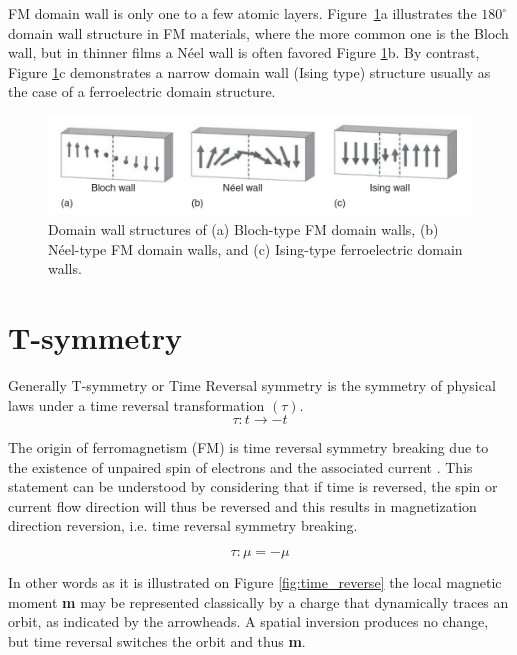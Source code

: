 FM domain wall is only one to a few atomic layers. Figure~\ref{fig:wall_structure}a illustrates the $180  ^\circ$ domain wall structure in FM materials, where the more common one is the Bloch wall, but in thinner films a Néel wall is often favored Figure \ref{fig:wall_structure}b. By contrast, Figure \ref{fig:wall_structure}c demonstrates a narrow domain wall (Ising type) structure usually as the case of a ferroelectric domain structure.

\begin{figure}[H]
\centering
\captionsetup{justification=centering,margin=2cm}
	\includegraphics[width=150mm]{fig/review/wall_structure.png}
	\caption[Domain wall structures.]{Domain wall structures of (a) Bloch-type FM domain walls, (b) Néel-type FM domain walls, and (c) Ising-type ferroelectric domain walls.}
\label{fig:wall_structure}
\end{figure}

\section{T-symmetry}
Generally T-symmetry or Time Reversal symmetry is the symmetry of physical laws under a time reversal transformation $( \tau )$.
\begin{equation}
\tau : t \rightarrow -t
\end{equation}

The origin of ferromagnetism (FM) is time reversal symmetry breaking due to the existence of unpaired spin of electrons and the associated current \cite{eerenstein2006multiferroic}. 
This statement
can be understood by considering that if time is reversed, the spin or current
flow direction will thus be reversed and this results in magnetization direction
reversion, i.e. time reversal symmetry breaking.

\begin{equation}
\tau : \mu = - \mu
\end{equation}

In other words as it is illustrated on Figure \ref{fig:time_reverse} the local magnetic moment \textbf{m} may be represented classically by a charge that dynamically traces an orbit, as indicated by the arrowheads. A spatial inversion produces no change, but time reversal switches the orbit and thus \textbf{m}.

